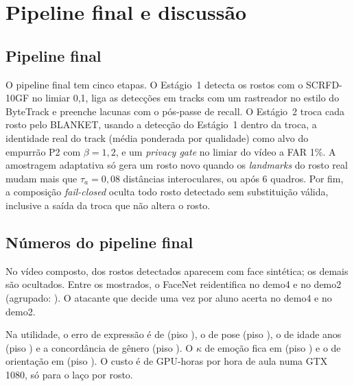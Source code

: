 \chapter{Pipeline final e discussão}
\label{cap:discussao}


\section{Pipeline final}

O pipeline final tem cinco etapas. O Estágio~1 detecta os rostos com o SCRFD-10GF no limiar 0,1, liga as detecções em tracks com um rastreador no estilo do ByteTrack e preenche lacunas com o pós-passe de recall. O Estágio~2 troca cada rosto pelo BLANKET, usando a detecção do Estágio~1 dentro da troca, a identidade real do track (média ponderada por qualidade) como alvo do empurrão P2 com $\beta = 1{,}2$, e um \emph{privacy gate} no limiar do vídeo a FAR 1\%. A amostragem adaptativa só gera um rosto novo quando os \emph{landmarks} do rosto real mudam mais que $\tau_a = 0{,}08$ distâncias interoculares, ou após 6 quadros. Por fim, a composição \emph{fail-closed} oculta todo rosto detectado sem substituição válida, inclusive a saída da troca que não altera o rosto.

\section{Números do pipeline final}

No vídeo composto,  dos rostos detectados aparecem com face sintética; os demais são ocultados. Entre os mostrados, o FaceNet reidentifica  no demo4 e  no demo2 (agrupado: ). O atacante que decide uma vez por aluno acerta  no demo4 e  no demo2.

Na utilidade, o erro de expressão é de  (piso ), o de pose \textdegree{} (piso \textdegree), o de idade  anos (piso ) e a concordância de gênero  (piso ). O $\kappa$ de emoção fica em  (piso ) e o de orientação em  (piso ). O custo é de  GPU-horas por hora de aula numa GTX 1080, só para o laço por rosto.

